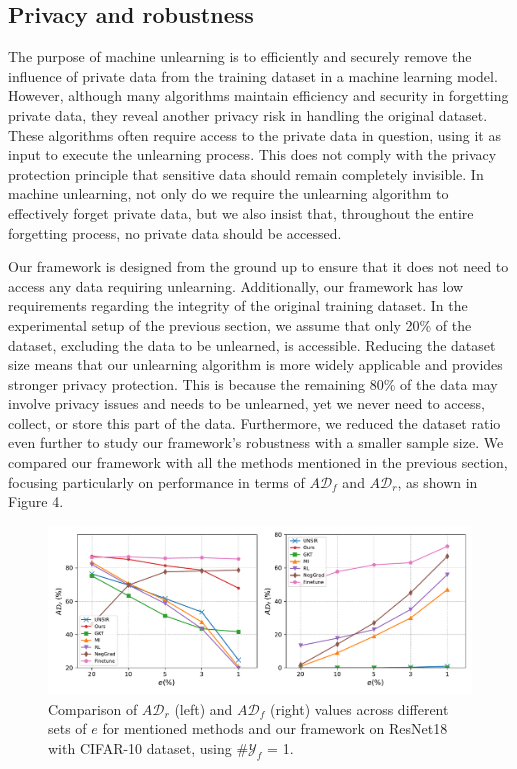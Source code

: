 \documentclass[preprint,12pt]{elsarticle}
\begin{document}
\subsection{Privacy and robustness}

The purpose of machine unlearning is to efficiently and securely remove the influence of private data from the training dataset in a machine learning model. However, although many algorithms maintain efficiency and security in forgetting private data, they reveal another privacy risk in handling the original dataset. These algorithms often require access to the private data in question, using it as input to execute the unlearning process. This does not comply with the privacy protection principle that sensitive data should remain completely invisible. In machine unlearning, not only do we require the unlearning algorithm to effectively forget private data, but we also insist that, throughout the entire forgetting process, no private data should be accessed.

Our framework is designed from the ground up to ensure that it does not need to access any data requiring unlearning. Additionally, our framework has low requirements regarding the integrity of the original training dataset. In the experimental setup of the previous section, we assume that only 20\% of the dataset, excluding the data to be unlearned, is accessible. Reducing the dataset size means that our unlearning algorithm is more widely applicable and provides stronger privacy protection. This is because the remaining 80\% of the data may involve privacy issues and needs to be unlearned, yet we never need to access, collect, or store this part of the data. Furthermore, we reduced the dataset ratio even further to study our framework's robustness with a smaller sample size. We compared our framework with all the methods mentioned in the previous section, focusing particularly on performance in terms of $A\mathcal{D}_f$ and $A\mathcal{D}_r$, as shown in Figure 4.


\begin{figure}[t]  
    \centering
    \includegraphics[width=\textwidth]{output4_new.pdf}
    \caption{Comparison of $A\mathcal{D}_r$ (left) and $A\mathcal{D}_f$ (right) values across different sets of \(e\) for mentioned methods and our framework on ResNet18 with CIFAR-10 dataset, using $\#\mathcal{Y}_f$ = 1.}
    \label{fig_figure4}
\end{figure}
\end{document}
